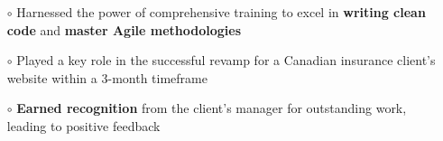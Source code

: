 \documentclass[10.8pt, a4paper]{extarticle}
\newcommand{\shorterSection}[1]{\vspace{-10pt}\section{#1}}
\begin{document}
\begin{itemize}
\begin{itemize}
          \item[$\circ$] Harnessed the power of comprehensive training to excel in \textbf{writing clean code} and \textbf{master Agile methodologies} \\[-0.6cm]
          \item[$\circ$] Played a key role in the successful revamp for a Canadian insurance client's website within a 3-month timeframe\\[-0.6cm]
          \item[$\circ$] \textbf{Earned recognition} from the client's manager for outstanding work, leading to positive feedback\\[-0.6cm]
    \end{itemize}
    \vspace{0.055cm}
\end{itemize}

\end{document}

